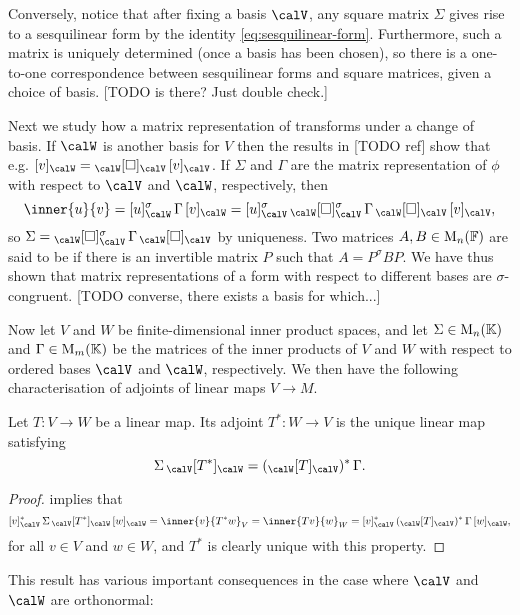 Conversely, notice that after fixing a basis $\calV$, any square matrix $\Sigma$ gives rise to a sesquilinear form by the identity \cref{eq:sesquilinear-form}. Furthermore, such a matrix is uniquely determined (once a basis has been chosen), so there is a one-to-one correspondence between sesquilinear forms and square matrices, given a choice of basis. [TODO is there? Just double check.]


Next we study how a matrix representation of transforms under a change of basis. If $\calW$ is another basis for $V$ then the results in [TODO ref] show that e.g. $\coordvec{v}{\calW} = \basischangemat{\calW}{\calV} \, \coordvec{v}{\calV}$. If $\Sigma$ and $\Gamma$ are the matrix representation of $\phi$ with respect to $\calV$ and $\calW$, respectively, then
%
\begin{equation*}
    \inner{u}{v}
        = \coordvec{u}{\calW}^\sigma \, \Gamma \, \coordvec{v}{\calW}
        = \coordvec{u}{\calV}^\sigma \, \basischangemat{\calW}{\calV}^\sigma \, \Gamma \, \basischangemat{\calW}{\calV} \, \coordvec{v}{\calV},
\end{equation*}
%
so $\Sigma = \basischangemat{\calW}{\calV}^\sigma \, \Gamma \, \basischangemat{\calW}{\calV}$ by uniqueness. Two matrices $A,B \in \mathrm{M}_{n}(\mathbb{F})$ are said to be  if there is an invertible matrix $P$ such that $A = P^\sigma BP$. We have thus shown that matrix representations of a form with respect to different bases are $\sigma$-congruent. [TODO converse, there exists a basis for which...]


Now let $V$ and $W$ be finite-dimensional inner product spaces, and let $\Sigma \in \mathrm{M}_{n}(\mathbb{K})$ and $\Gamma \in \mathrm{M}_{m}(\mathbb{K})$ be the matrices of the inner products of $V$ and $W$ with respect to ordered bases $\calV$ and $\calW$, respectively. We then have the following characterisation of adjoints of linear maps $V \to M$.

\begin{proposition}
    \label{prop:adjoint-formula-IP-matrix}
    Let $T \colon V \to W$ be a linear map. Its adjoint $T^* \colon W \to V$ is the unique linear map satisfying
    \begin{equation*}
        \Sigma \, \mr{\calV}{T^*}{\calW}
            = (\mr{\calW}{T}{\calV})^* \, \Gamma.
    \end{equation*}
\end{proposition}

\begin{proof}
     implies that
    \begin{equation*}
        \coordvec{v}{\calV}^* \, \Sigma \, \mr{\calV}{T^*}{\calW} \, \coordvec{w}{\calW}
            = \inner{v}{T^* w}_V
            = \inner{Tv}{w}_W
            = \coordvec{v}{\calV}^* \, (\mr{\calW}{T}{\calV})^* \, \Gamma \, \coordvec{w}{\calW},
    \end{equation*}
    for all $v \in V$ and $w \in W$, and $T^*$ is clearly unique with this property.
\end{proof}
%
This result has various important consequences in the case where $\calV$ and $\calW$ are orthonormal:

